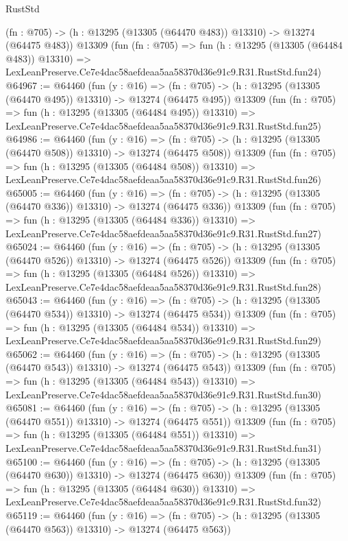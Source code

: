 \begin{lexlean}{RustStd}
\begin{coremodule}
    (fn : @705) -> (h : @13295 (@13305 (@64470 @483)) @13310) -> @13274 (@64475 @483))
    @13309
    (fun (fn : @705) =>
    fun (h : @13295 (@13305 (@64484 @483)) @13310) =>
    LexLeanPreserve.Ce7e4dac58aefdeaa5aa58370d36e91c9.R31.RustStd.fun24)
@64967 := @64460
    (fun (y : @16) =>
    (fn : @705) -> (h : @13295 (@13305 (@64470 @495)) @13310) -> @13274 (@64475 @495))
    @13309
    (fun (fn : @705) =>
    fun (h : @13295 (@13305 (@64484 @495)) @13310) =>
    LexLeanPreserve.Ce7e4dac58aefdeaa5aa58370d36e91c9.R31.RustStd.fun25)
@64986 := @64460
    (fun (y : @16) =>
    (fn : @705) -> (h : @13295 (@13305 (@64470 @508)) @13310) -> @13274 (@64475 @508))
    @13309
    (fun (fn : @705) =>
    fun (h : @13295 (@13305 (@64484 @508)) @13310) =>
    LexLeanPreserve.Ce7e4dac58aefdeaa5aa58370d36e91c9.R31.RustStd.fun26)
@65005 := @64460
    (fun (y : @16) =>
    (fn : @705) -> (h : @13295 (@13305 (@64470 @336)) @13310) -> @13274 (@64475 @336))
    @13309
    (fun (fn : @705) =>
    fun (h : @13295 (@13305 (@64484 @336)) @13310) =>
    LexLeanPreserve.Ce7e4dac58aefdeaa5aa58370d36e91c9.R31.RustStd.fun27)
@65024 := @64460
    (fun (y : @16) =>
    (fn : @705) -> (h : @13295 (@13305 (@64470 @526)) @13310) -> @13274 (@64475 @526))
    @13309
    (fun (fn : @705) =>
    fun (h : @13295 (@13305 (@64484 @526)) @13310) =>
    LexLeanPreserve.Ce7e4dac58aefdeaa5aa58370d36e91c9.R31.RustStd.fun28)
@65043 := @64460
    (fun (y : @16) =>
    (fn : @705) -> (h : @13295 (@13305 (@64470 @534)) @13310) -> @13274 (@64475 @534))
    @13309
    (fun (fn : @705) =>
    fun (h : @13295 (@13305 (@64484 @534)) @13310) =>
    LexLeanPreserve.Ce7e4dac58aefdeaa5aa58370d36e91c9.R31.RustStd.fun29)
@65062 := @64460
    (fun (y : @16) =>
    (fn : @705) -> (h : @13295 (@13305 (@64470 @543)) @13310) -> @13274 (@64475 @543))
    @13309
    (fun (fn : @705) =>
    fun (h : @13295 (@13305 (@64484 @543)) @13310) =>
    LexLeanPreserve.Ce7e4dac58aefdeaa5aa58370d36e91c9.R31.RustStd.fun30)
@65081 := @64460
    (fun (y : @16) =>
    (fn : @705) -> (h : @13295 (@13305 (@64470 @551)) @13310) -> @13274 (@64475 @551))
    @13309
    (fun (fn : @705) =>
    fun (h : @13295 (@13305 (@64484 @551)) @13310) =>
    LexLeanPreserve.Ce7e4dac58aefdeaa5aa58370d36e91c9.R31.RustStd.fun31)
@65100 := @64460
    (fun (y : @16) =>
    (fn : @705) -> (h : @13295 (@13305 (@64470 @630)) @13310) -> @13274 (@64475 @630))
    @13309
    (fun (fn : @705) =>
    fun (h : @13295 (@13305 (@64484 @630)) @13310) =>
    LexLeanPreserve.Ce7e4dac58aefdeaa5aa58370d36e91c9.R31.RustStd.fun32)
@65119 := @64460
    (fun (y : @16) =>
    (fn : @705) -> (h : @13295 (@13305 (@64470 @563)) @13310) -> @13274 (@64475 @563))

\end{coremodule}
\end{lexlean}
